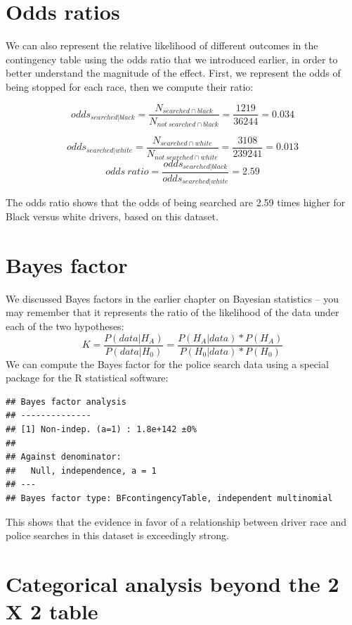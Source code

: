 \documentclass[12pt,]{book}
\theoremstyle{definition}
\theoremstyle{definition}
\theoremstyle{definition}
\theoremstyle{remark}
\begin{document}
\hypertarget{odds-ratios}{%
\section{Odds ratios}\label{odds-ratios}}

We can also represent the relative likelihood of different outcomes in the contingency table using the odds ratio that we introduced earlier, in order to better understand the magnitude of the effect. First, we represent the odds of being stopped for each race, then we compute their ratio:

\[
odds_{searched|black} = \frac{N_{searched\cap black}}{N_{not\ searched\cap black}} = \frac{1219}{36244} = 0.034
\]

\[
odds_{searched|white} = \frac{N_{searched\cap white}}{N_{not\ searched\cap white}} = \frac{3108}{239241} = 0.013
\]
\[
odds\ ratio = \frac{odds_{searched|black}}{odds_{searched|white}} = 2.59
\]

The odds ratio shows that the odds of being searched are 2.59 times higher for Black versus white drivers, based on this dataset.

\hypertarget{bayes-factor}{%
\section{Bayes factor}\label{bayes-factor}}

We discussed Bayes factors in the earlier chapter on Bayesian statistics -- you may remember that it represents the ratio of the likelihood of the data under each of the two hypotheses:
\[ 
K = \frac{P(data|H_A)}{P(data|H_0)} = \frac{P(H_A|data)*P(H_A)}{P(H_0|data)*P(H_0)}
\]
We can compute the Bayes factor for the police search data using a special package for the R statistical software:

\begin{verbatim}
## Bayes factor analysis
## --------------
## [1] Non-indep. (a=1) : 1.8e+142 ±0%
## 
## Against denominator:
##   Null, independence, a = 1 
## ---
## Bayes factor type: BFcontingencyTable, independent multinomial
\end{verbatim}

This shows that the evidence in favor of a relationship between driver race and police searches in this dataset is exceedingly strong.

\hypertarget{categorical-analysis-beyond-the-2-x-2-table}{%
\section{Categorical analysis beyond the 2 X 2 table}\label{categorical-analysis-beyond-the-2-x-2-table}}
\end{document}
